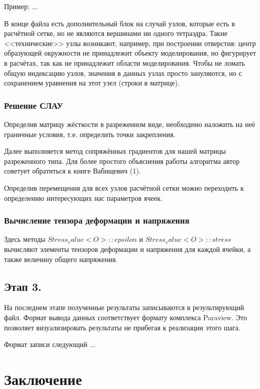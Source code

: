 \documentclass[a4paper,12pt]{article}
\begin{document}
Пример: ...


В конце файла есть дополнительный блок на случай узлов, которые есть в расчётной сетке, но не являются вершинами ни одного тетраэдра. Такие <<технические>> узлы возникают, например, при построении отверстия: центр образующей окружности не принадлежит объекту моделирования, но фигурирует в расчётах, так как не принадлежит области моделирования. Чтобы не ломать общую индексацию узлов, значения в данных узлах просто зануляются, но с сохранением уравнения на этот узел (строки в матрице).


\subsubsection{Решение СЛАУ}
Определив матрицу жёсткости в разреженном виде, необходимо наложить на неё граничные условия, т.е. определить точки закрепления. 

Далее выполняется метод сопряжённых градиентов для нашей матрицы разреженного типа. Для более простого объяснения работы алгоритма автор советует обратиться к книге Вабищевич (1). 

Определив перемещения для всех узлов расчётной сетки можно переходить к определению интересующих нас параметров ячеек.

\subsubsection{Вычисление тензора деформации и напряжения}

Здесь методы $Stress_value<O>::epsilon$ и $Stress_value<O>::stress$ вычисляют элементы тензоров деформации и напряжения для каждой ячейки, а также величину общего напряжения.

\subsection{Этап 3.}
	На последнем этапе полученные результаты записываются в результирующий файл. Формат вывода данных соответствует формату комплекса Paraview. Это позволяет визуализировать результаты не прибегая к реализации этого шага.
	
	Формат записи следующий ...
	
	
\section{Заключение}	 
	
	
\end{document}

